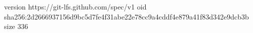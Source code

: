 version https://git-lfs.github.com/spec/v1
oid sha256:2d2666937156d9bc5d7fe4f31abe22e78cc9a4cddf4e879a41f83d342e9dcb3b
size 336
